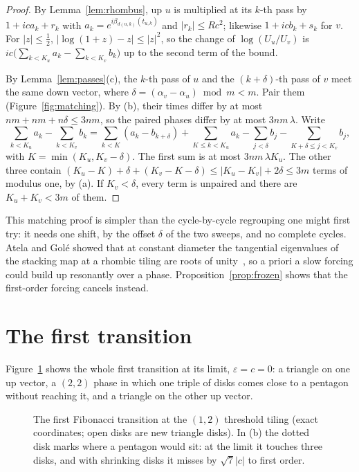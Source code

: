 \documentclass[11pt]{amsart}
\theoremstyle{definition}
\newcommand{\eps}{\varepsilon}
\begin{document}
\begin{proof}
By Lemma~\ref{lem:rhombus}, up $u$ is multiplied at its $k$-th pass by $1+ica_k+r_k$ with
$a_k=e^{i\beta_{d(u,k)}(t_{u,k})}$ and $|r_k|\le Rc^2$; likewise $1+icb_k+s_k$ for $v$. For
$|z|\le\frac12$, $|\log(1+z)-z|\le|z|^2$, so the change of $\log(U_u/U_v)$ is
$ic\bigl(\sum_{k<K_u}a_k-\sum_{k<K_v}b_k\bigr)$ up to the second term of the bound.

By Lemma~\ref{lem:passes}(c), the $k$-th pass of $u$ and the $(k+\delta)$-th pass of $v$ meet the same
down vector, where $\delta=(\alpha_v-\alpha_u)\bmod m<m$. Pair them (Figure~\ref{fig:matching}). By
(b), their times differ by at most $nm+nm+n\delta\le3nm$, so the paired phases differ by at most
$3nm\,\lambda$. Write
\[
\sum_{k<K_u}a_k-\sum_{k<K_v}b_k=\sum_{k<K}(a_k-b_{k+\delta})+\sum_{K\le k<K_u}a_k
-\sum_{j<\delta}b_j-\sum_{K+\delta\le j<K_v}b_j,
\]
with $K=\min(K_u,K_v-\delta)$. The first sum is at most $3nm\,\lambda K_u$. The other three contain
$(K_u-K)+\delta+(K_v-K-\delta)\le|K_u-K_v|+2\delta\le3m$ terms of modulus one, by (a). If
$K_v<\delta$, every term is unpaired and there are $K_u+K_v<3m$ of them.
\end{proof}

This matching proof is simpler than the cycle-by-cycle regrouping one might first try: it needs one
shift, by the offset $\delta$ of the two sweeps, and no complete cycles. Atela and Gol\'e showed that at
constant diameter the tangential eigenvalues of the stacking map at a rhombic tiling are roots of
unity~\cite{AtelaGole}, so a priori a slow forcing could build up resonantly over a phase.
Proposition~\ref{prop:frozen} shows that the first-order forcing cancels instead.

\section{The first transition}\label{sec:stepone}

Figure~\ref{fig:stepone} shows the whole first transition at its limit, $\eps=c=0$: a triangle on one up
vector, a $(2,2)$ phase in which one triple of disks comes close to a pentagon without reaching it, and a
triangle on the other up vector.

\begin{figure}[t]
\centering
\begin{tikzpicture}[x=1.0cm,y=1.0cm]

\end{tikzpicture}
\caption{The first Fibonacci transition at the $(1,2)$ threshold tiling (exact coordinates; open disks are
new triangle disks). In (b) the dotted disk marks where a pentagon would sit: at the limit it touches three
disks, and with shrinking disks it misses by $\sqrt7|c|$ to first order.}\label{fig:stepone}
\end{figure}
\end{document}
